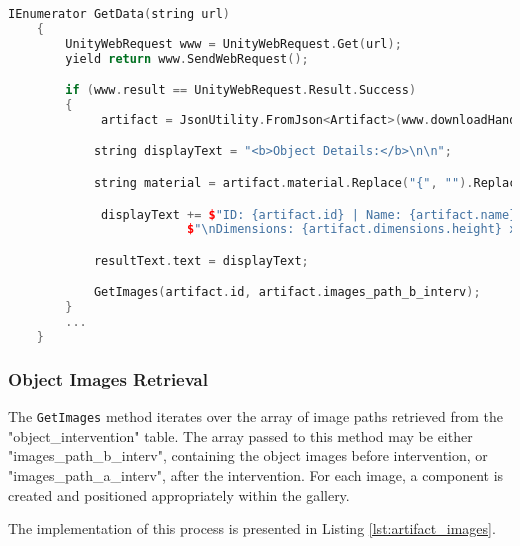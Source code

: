 \begin{lstlisting}[language=C++,label={lst:get_data}, caption={Method used to get object data from the database doing.}]
      IEnumerator GetData(string url)
    {
        UnityWebRequest www = UnityWebRequest.Get(url);
        yield return www.SendWebRequest();

        if (www.result == UnityWebRequest.Result.Success)
        {
             artifact = JsonUtility.FromJson<Artifact>(www.downloadHandler.text);

            string displayText = "<b>Object Details:</b>\n\n";

            string material = artifact.material.Replace("{", "").Replace("}", "");

             displayText += $"ID: {artifact.id} | Name: {artifact.name} \nMaterial: {material} | Epoch: {artifact.epoch} \nProvenance: {artifact.provenance}" +
                         $"\nDimensions: {artifact.dimensions.height} x {artifact.dimensions.width} cm, Weight: {Mathf.Round(artifact.dimensions.weight * 10.0f) * 0.1f} g";

            resultText.text = displayText;

            GetImages(artifact.id, artifact.images_path_b_interv);
        }
        ...
    }
\end{lstlisting}

\subsubsection{Object Images Retrieval}

The \texttt{GetImages} method iterates over the array of image paths retrieved from the "object\_intervention" table. The array passed to this method may be either "images\_path\_b\_interv", containing the object images before intervention, or "images\_path\_a\_interv", after the intervention.
For each image, a component is created and positioned appropriately within the gallery.

The implementation of this process is presented in Listing \ref{lst:artifact_images}.

